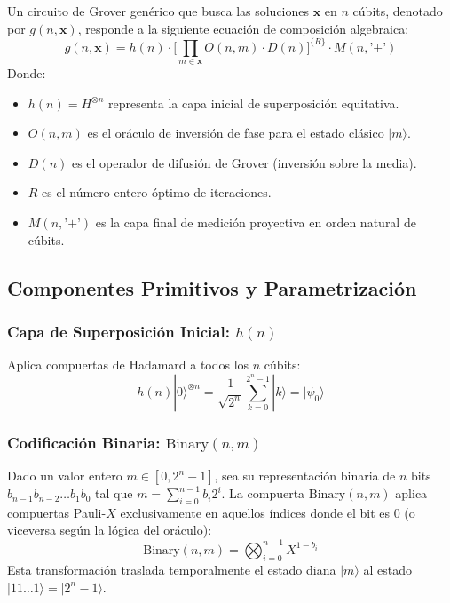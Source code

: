 \documentclass[11pt,a4paper]{article}
\begin{document}
Un circuito de Grover genérico que busca las soluciones $\mathbf{x}$ en $n$ cúbits, denotado por $g(n, \mathbf{x})$, responde a la siguiente ecuación de composición algebraica:
\begin{equation}
    g(n, \mathbf{x}) = h(n) \cdot \Big[ \prod_{m \in \mathbf{x}} O(n, m) \cdot D(n) \Big]^{\{R\}} \cdot M(n, \text{'+'})
\end{equation}
Donde:
\begin{itemize}
    \item $h(n) = H^{\otimes n}$ representa la capa inicial de superposición equitativa.
    \item $O(n, m)$ es el oráculo de inversión de fase para el estado clásico $|m\rangle$.
    \item $D(n)$ es el operador de difusión de Grover (inversión sobre la media).
    \item $R$ es el número entero óptimo de iteraciones.
    \item $M(n, \text{'+'})$ es la capa final de medición proyectiva en orden natural de cúbits.
\end{itemize}

\subsection{Componentes Primitivos y Parametrización}

\subsubsection{Capa de Superposición Inicial: \texorpdfstring{$h(n)$}{h(n)}}
Aplica compuertas de Hadamard a todos los $n$ cúbits:
\begin{equation}
    h(n)|0\rangle^{\otimes n} = \frac{1}{\sqrt{2^n}} \sum_{k=0}^{2^n-1} |k\rangle = |\psi_0\rangle
\end{equation}

\subsubsection{Codificación Binaria: \texorpdfstring{$\text{Binary}(n, m)$}{Binary(n, m)}}
Dado un valor entero $m \in [0, 2^n - 1]$, sea su representación binaria de $n$ bits $b_{n-1}b_{n-2}\dots b_1 b_0$ tal que $m = \sum_{i=0}^{n-1} b_i 2^i$. La compuerta $\text{Binary}(n, m)$ aplica compuertas Pauli-$X$ exclusivamente en aquellos índices donde el bit es $0$ (o viceversa según la lógica del oráculo):
\begin{equation}
    \text{Binary}(n, m) = \bigotimes_{i=0}^{n-1} X^{1 - b_i}
\end{equation}
Esta transformación traslada temporalmente el estado diana $|m\rangle$ al estado $|11\dots 1\rangle = |2^n - 1\rangle$.
\end{document}
